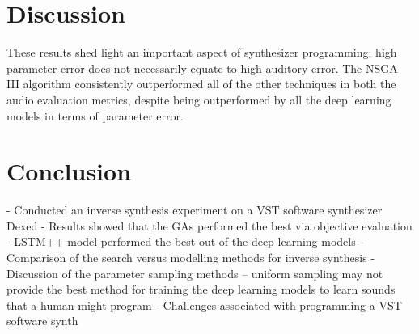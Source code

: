 \section{Discussion}
\label{sec:inverse-synth-discuss}

 These results shed light an important aspect of synthesizer programming: high parameter error does not necessarily equate to high auditory error. The NSGA-III algorithm consistently outperformed all of the other techniques in both the audio evaluation metrics, despite being outperformed by all the deep learning models in terms of parameter error. 


\section{Conclusion}

- Conducted an inverse synthesis experiment on a VST software synthesizer Dexed
- Results showed that the GAs performed the best via objective evaluation
- LSTM++ model performed the best out of the deep learning models
- Comparison of the search versus modelling methods for inverse synthesis
- Discussion of the parameter sampling methods -- uniform sampling may not provide the best method for training the deep learning models to learn sounds that a human might program
- Challenges associated with programming a VST software synth




